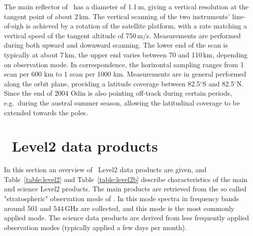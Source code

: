 The main reflector of \smr\ has a diameter of 1.1\,m, giving a
vertical resolution at the tangent point of about 2\,km. The vertical scanning
of the two instruments' line-of-sigh is achieved by a rotation of the satellite
platform, with a rate matching a vertical speed of the tangent altitude of
750\,m/s. Measurements are performed during both upward and downward scanning.
The lower end of the scan is typically at about 7\,km, the upper end varies
between 70 and 110\,km, depending on observation mode. In correspondence,
the horizontal sampling ranges from 1 scan per 600 km to 1 scan per 1000 km.
Measurements are in general performed along the orbit plane, providing a
latitude coverage between 82.5$^{\circ}$S and 82.5$^{\circ}$N. Since the end of
2004 Odin is also pointing off-track during certain periods, e.g.\ during the
austral summer season, allowing the latitudinal coverage to be extended towards
the poles. 


\section{\smr\ Level2 data products}
In this section an overview of \smr\ Level2 data products are given, and
Table~\ref{table:level2} and Table~\ref{table:level2b} describe characteristics of the main 
and science Level2 products.
The main products are retrieved from the so called "stratospheric" observation mode
of \smr. In this mode spectra in frequency bands around 501 and 544\,GHz are collected,
and this mode is the most commonly applied mode.
The science data products are derived from less frequently applied observation modes
(typically applied a few days per month).  




